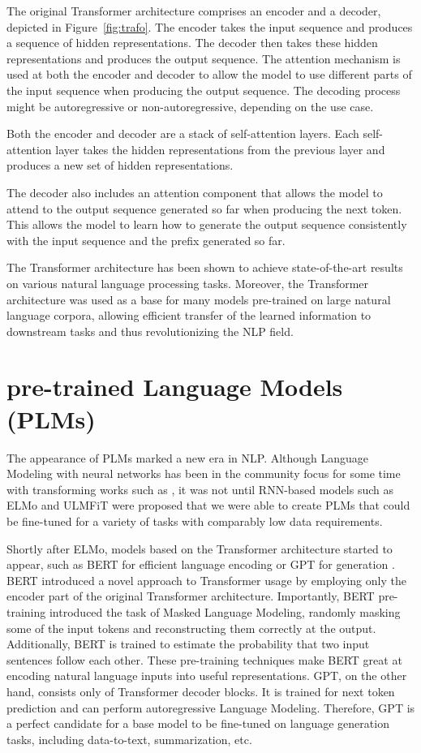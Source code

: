 The original Transformer architecture comprises an encoder and a decoder, depicted in Figure~\ref{fig:trafo}.
The encoder takes the input sequence and produces a sequence of hidden representations.
The decoder then takes these hidden representations and produces the output sequence.
The attention mechanism is used at both the encoder and decoder to allow the model to use different parts of the input sequence when producing the output sequence.
The decoding process might be autoregressive or non-autoregressive, depending on the use case.

Both the encoder and decoder are a stack of self-attention layers.
Each self-attention layer takes the hidden representations from the previous layer and produces a new set of hidden representations.

The decoder also includes an attention component that allows the model to attend to the output sequence generated so far when producing the next token.
This allows the model to learn how to generate the output sequence consistently with the input sequence and the prefix generated so far.

The Transformer architecture has been shown to achieve state-of-the-art results on various natural language processing tasks. 
Moreover, the Transformer architecture was used as a base for many models pre-trained on large natural language corpora, allowing efficient transfer of the learned information to downstream tasks and thus revolutionizing the NLP field.

\section{pre-trained Language Models (PLMs)}
\label{background:plms}
The appearance of PLMs marked a new era in NLP.
Although Language Modeling with neural networks has been in the community focus for some time with transforming works such as  \citet{mikolov2010recurrent,mikolov2013distributed}, it was not until RNN-based models such as ELMo \cite{peters-etal-2018-deep} and ULMFiT \cite{howard-ruder-2018-universal} were proposed that we were able to create PLMs that could be fine-tuned for a variety of tasks with comparably low data requirements.

Shortly after ELMo, models based on the Transformer architecture started to appear, such as BERT for efficient language encoding \cite{devlin2019} or GPT for generation \cite{radford2018improving}.
BERT introduced a novel approach to Transformer usage by employing only the encoder part of the original Transformer architecture.
Importantly, BERT pre-training introduced the task of Masked Language Modeling, randomly masking some of the input tokens and reconstructing them correctly at the output.
Additionally, BERT is trained to estimate the probability that two input sentences follow each other.
These pre-training techniques make BERT great at encoding natural language inputs into useful representations.
GPT, on the other hand, consists only of Transformer decoder blocks.
It is trained for next token prediction and can perform autoregressive Language Modeling.
Therefore, GPT is a perfect candidate for a base model to be fine-tuned on language generation tasks, including data-to-text, summarization, etc.


